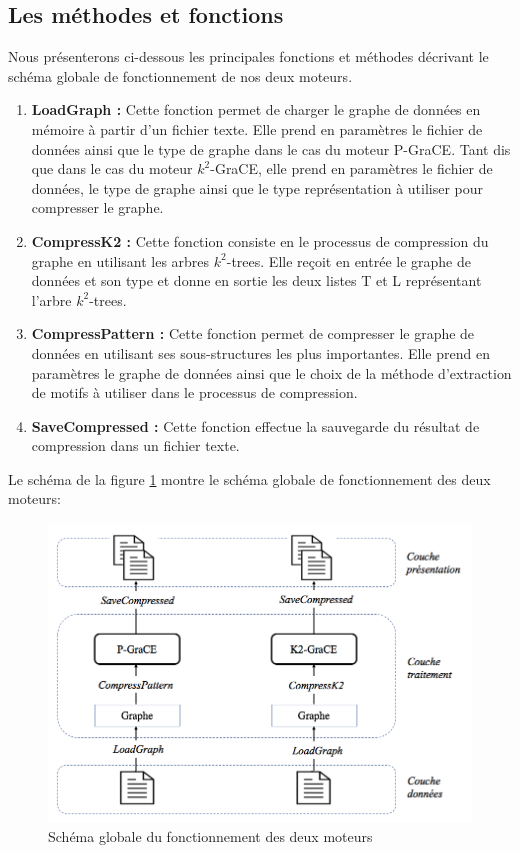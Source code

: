 \subsection{Les méthodes et fonctions }
	Nous présenterons ci-dessous les principales fonctions et méthodes décrivant le schéma globale de fonctionnement de nos deux moteurs.
	
	\begin{enumerate}[label=(\alph*)]
		\item \textbf{LoadGraph :} Cette fonction permet de charger le graphe de données en mémoire à partir d'un fichier texte. Elle prend en paramètres le fichier de données ainsi que le type de graphe dans le cas du moteur P-GraCE. Tant dis que dans le cas du moteur $k^2$-GraCE, elle prend en paramètres le fichier de données, le type de graphe ainsi que le type représentation à utiliser pour compresser le graphe.
		\item \textbf{CompressK2 :} Cette fonction consiste en le processus de compression du graphe en utilisant les arbres $k^2$-trees. Elle reçoit en entrée le graphe de données et son type et donne en sortie les deux listes T et L représentant l'arbre $k^2$-trees.
		
		\item \textbf{CompressPattern :} Cette fonction permet de compresser le graphe de données en utilisant ses sous-structures les plus importantes. Elle prend en paramètres le graphe de données ainsi que le choix de la méthode d'extraction de motifs à utiliser dans le processus de compression.
		
		\item \textbf{SaveCompressed :}  Cette fonction effectue la sauvegarde du résultat de compression dans un fichier texte.
		
	\end{enumerate}	
	
	Le schéma de la figure \ref{Img:functMethod} montre le schéma globale de fonctionnement des deux moteurs:  
	
	\begin{figure}[H]
	
	
	\includegraphics[scale=0.5]{ressources/image/funct.png}
	\centering
	\caption{Schéma globale du fonctionnement des deux moteurs}
	\label{Img:functMethod}
 \end{figure}
	
